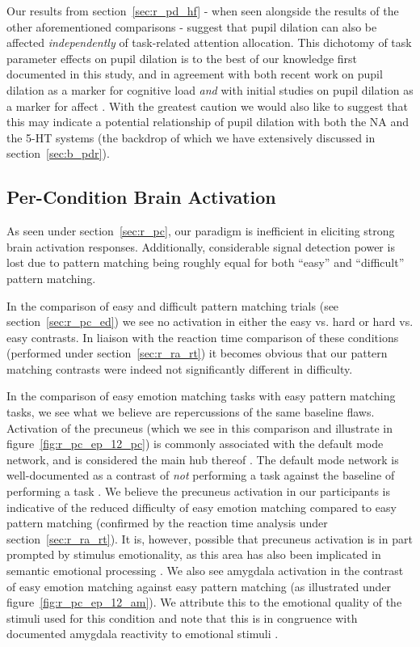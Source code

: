 	    Our results from section~\ref{sec:r_pd_hf} - when seen alongside the results of the other aforementioned comparisons - suggest that pupil dilation can also be affected \textit{independently} of task-related attention allocation.
	    This dichotomy of task parameter effects on pupil dilation is to the best of our knowledge first documented in this study, and in agreement with both recent work on pupil dilation as a marker for cognitive load \textit{and} with initial studies on pupil dilation as a marker for affect \citep{Nunally1967, Bradshaw1967}.
	    With the greatest caution we would also like to suggest that this may indicate a potential relationship of pupil dilation with both the NA and the 5-HT systems (the backdrop of which we have extensively discussed in section~\ref{sec:b_pdr}).
	\subsection{Per-Condition Brain Activation}
	    As seen under section~\ref{sec:r_pc}, our paradigm is inefficient in eliciting strong brain activation responses.
	    Additionally, considerable signal detection power is lost due to pattern matching being roughly equal for both “easy” and “difficult” pattern matching.
	    
	    In the comparison of easy and difficult pattern matching trials (see section~\ref{sec:r_pc_ed}) we see no activation in either the easy vs. hard or hard vs. easy contrasts.
	    In liaison with the reaction time comparison of these conditions (performed under section~\ref{sec:r_ra_rt}) it becomes obvious that our pattern matching contrasts were indeed not significantly different in difficulty.
	    
	    In the comparison of easy emotion matching tasks with easy pattern matching tasks, we see what we believe are repercussions of the same baseline flaws.
	    Activation of the precuneus (which we see in this comparison and illustrate in figure~\ref{fig:r_pc_ep_12_pc}) is commonly associated with the default mode network, and is considered the main hub thereof \citep{Cavanna2007}.
	    The default mode network is well-documented as a contrast of \textit{not} performing a task against the baseline of performing a task \citep{Raichle2007}.
	    We believe the precuneus activation in our participants is indicative of the reduced difficulty of easy emotion matching compared to easy pattern matching (confirmed by the reaction time analysis under section~\ref{sec:r_ra_rt}).
	    It is, however, possible that precuneus activation is in part prompted by stimulus emotionality, as this area has also been implicated in semantic emotional processing \citep{Maddock2003}.
	    We also see amygdala activation in the contrast of easy emotion matching against easy pattern matching (as illustrated under figure~\ref{fig:r_pc_ep_12_am}).
	    We attribute this to the emotional quality of the stimuli used for this condition and note that this is in congruence with documented amygdala reactivity to emotional stimuli \citep{Hariri2002}.
	    
